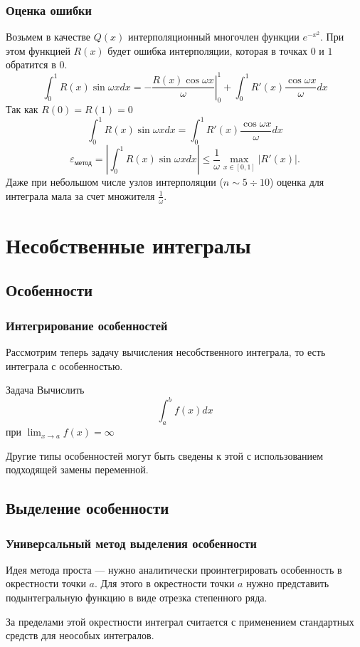 \documentclass[apectratio=43,unicode]{beamer}
\begin{document}
\begin{frame}
\frametitle{Оценка ошибки}
	Возьмем в качестве $Q(x)$ интерполяционный многочлен функции $e^{-x^2}$. При этом функцией $R(x)$
	будет ошибка интерполяции, которая в точках $0$ и $1$ обратится в $0$.
	\[
	\int_0^1 R(x) \sin \omega x dx = - \left.\frac{R(x) \cos \omega x}{\omega} \right|_0^1 +
	\int_0^1 R'(x) \frac{\cos \omega x}{\omega} dx
	\]
	Так как $R(0)=R(1)=0$
	\[
	\int_0^1 R(x) \sin \omega x dx = \int_0^1 R'(x) \frac{\cos \omega x}{\omega} dx
	\]
	\[
	\varepsilon_{\text{метод}} = \left| \int_0^1 R(x) \sin \omega x dx \right| \leq \frac{1}{\omega} \max_{x\in[0,1]} |R'(x)|.
	\]
	Даже при небольшом числе узлов интерполяции ($n \sim 5 \div 10$) оценка для интеграла мала за счет множителя $\frac{1}{\omega}$.
\end{frame}

\section{Несобственные интегралы}
\subsection{Особенности}
\begin{frame}
\frametitle{Интегрирование особенностей}
	Рассмотрим теперь задачу вычисления несобственного интеграла, то есть интеграла с особенностью.
	\pause
	\begin{block}{Задача}
		Вычислить
		\[
		\int_a^b f(x) dx
		\]
		при $\lim_{x \rightarrow a}f(x) = \infty$
	\end{block}
	\pause

	Другие типы особенностей могут быть сведены к этой с использованием подходящей замены переменной.
\end{frame}

\subsection{Выделение особенности}
\begin{frame}
\frametitle{Универсальный метод выделения особенности}
	Идея метода %
	проста --- нужно аналитически проинтегрировать особенность
	в окрестности точки $a$. Для этого в окрестности точки $a$ нужно представить
	подынтегральную функцию в виде отрезка степенного ряда.

	За пределами этой окрестности интеграл считается с применением стандартных средств для
	неособых интегралов.
\end{frame}
\end{document}
